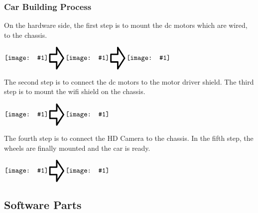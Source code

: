 \documentclass[11pt]{article}
\newcommand*{\vimaged}[1]{\vcenter{\hbox{\texttt{[image: \#1]}}}}
\newcommand*{\vpointer}{\vcenter{\hbox{\scalebox{2}{\Huge\pointer}}}}
\begin{document}
\subsubsection{Car Building Process}
\begin{flushleft}
On the hardware side, the first step is to mount the dc motors which are wired, to the chassis.
\end{flushleft}
\begin{center}
$\vimaged{chasises1.png}\vpointer\vimaged{dc_motors1.png}\vpointer\vimaged{motorsfinal.png}$
\end{center}
\vspace{0.15cm}
\begin{flushleft}
The second step is to connect the dc motors to the motor driver shield. The third step is to mount the wifi shield on the chassis.
\end{flushleft}
\begin{center}
$\vimaged{shield_chasis.png}\vpointer\vimaged{shield_wifi_chasis.png}$
\end{center}
\vspace{0.15cm}
\begin{flushleft}
The fourth step is to connect the HD Camera to the chassis. In the fifth step, the wheels are finally mounted and the car is ready.
\end{flushleft}
\begin{center}
$\vimaged{shield_wifi_cam_chasis}\vpointer\vimaged{shield_wifi_wheels_chasis}$
\end{center}

\pagebreak

\subsection{Software Parts}
\end{document}
